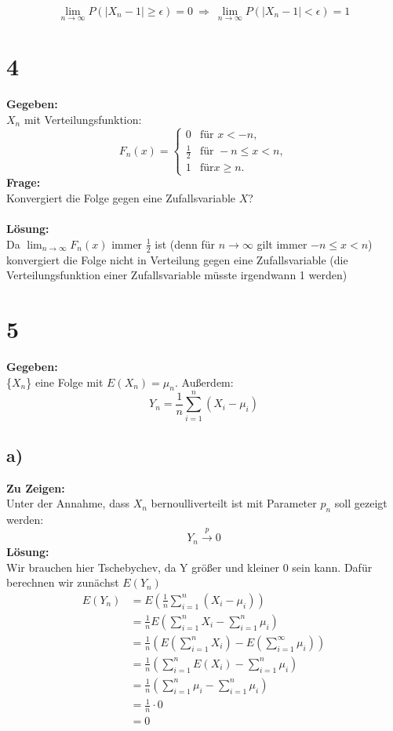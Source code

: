 \documentclass{article}
\begin{document}
\[\lim_{n \rightarrow \infty}P(|X_n-1|\geq \epsilon) = 0 ~\Rightarrow~\lim_{n \rightarrow \infty}P(|X_n-1|< \epsilon) =1\] 
\section*{4} 
\textbf{Gegeben:}\\

$X_n$ mit Verteilungsfunktion:
\[F_n(x) = \begin{cases}
    0 &\text{für } x < -n, \\
    \frac{1}{2} &\text{für } -n \leq x < n,\\
    1 &\text{für} x \geq n.
\end{cases}\]
\textbf{Frage:}\\

Konvergiert die Folge gegen eine Zufallsvariable $X$?\\ \\
\textbf{Lösung:}\\

Da $\lim_{n \rightarrow \infty} F_n(x)$ immer $\frac{1}{2}$ ist (denn für $n \rightarrow \infty$ gilt immer $-n \leq x < n$) konvergiert die Folge nicht in Verteilung gegen eine Zufallsvariable (die Verteilungsfunktion einer Zufallsvariable müsste irgendwann 1 werden)
\section*{5}
\textbf{Gegeben:}\\

\{$X_n$\} eine Folge mit $E(X_n) = \mu_n$. Außerdem:
\[Y_n= \frac{1}{n}\sum_{i=1}^{n} (X_i - \mu_i)\]
\subsection*{a)}
\textbf{Zu Zeigen:}\\

Unter der Annahme, dass $X_n$ bernoulliverteilt ist mit Parameter $p_n$ soll gezeigt werden: 
\[Y_n \overset{p}{\longrightarrow}0\]
\textbf{Lösung:}\\

Wir brauchen hier Tschebychev, da Y größer und kleiner 0 sein kann. Dafür berechnen wir zunächst $E(Y_n)$
\begin{align*}
    E(Y_n)&= E(\frac{1}{n} \sum_{i = 1}^{n} (X_i - \mu_i)) \\
    &= \frac{1}{n}E(\sum_{i = 1}^{n}X_i - \sum_{i = 1}^{n}\mu_i)\\
    &= \frac{1}{n}(E(\sum_{i=1}^{n}X_i) - E(\sum_{i=1}^{\infty}\mu_i))\\
    &= \frac{1}{n}(\sum_{i = 1}^{n}E(X_i) - \sum_{i=1}^{n} \mu_i) \\
    &= \frac{1}{n}(\sum_{i = 1}^{n}\mu_i - \sum_{i=1}^{n} \mu_i) \\
    &= \frac{1}{n}\cdot 0 \\
    &= 0
\end{align*}
\end{document}
